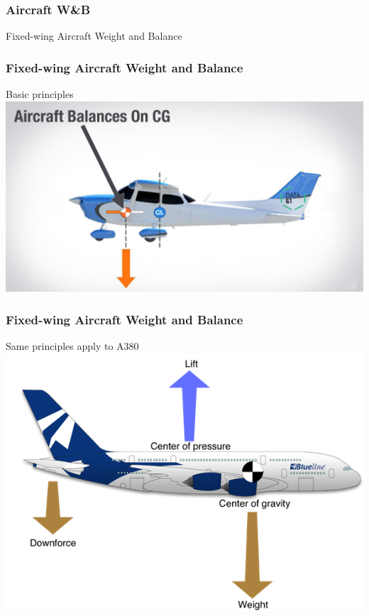 \begin{frame}
\frametitle{Aircraft W\&B}
\begin{center}
Fixed-wing Aircraft Weight and Balance
\end{center}
\end{frame}

\begin{frame}
\frametitle{Fixed-wing Aircraft Weight and Balance}
\begin{block}{Basic principles}
\includegraphics[height=0.5\textheight]{image/aircraft-cg.jpg}
\end{block}
\end{frame}

\begin{frame}
\frametitle{Fixed-wing Aircraft Weight and Balance}
\begin{block}{Same principles apply to A380}
\includegraphics[height=0.5\textheight]{image/aircraft-cg-a380.png}
\end{block}
\end{frame}

